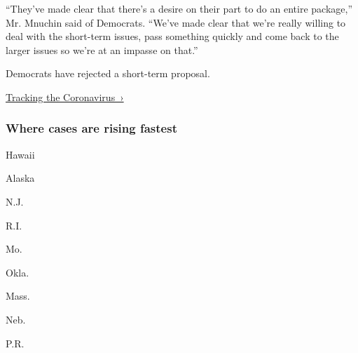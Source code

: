 ``They've made clear that there's a desire on their part to do an entire
package,'' Mr. Mnuchin said of Democrats. ``We've made clear that we're
really willing to deal with the short-term issues, pass something
quickly and come back to the larger issues so we're at an impasse on
that.''

Democrats have rejected a short-term proposal.

\href{https://www.nytimes.com/interactive/2020/us/coronavirus-us-cases.html}{Tracking
the Coronavirus~›}

\href{https://www.nytimes.com/interactive/2020/us/coronavirus-us-cases.html}{}

\hypertarget{where-cases-are-rising-fastest}{%
\subsubsection{\texorpdfstring{Where cases are \textbf{rising}
fastest}{Where cases are rising fastest}}\label{where-cases-are-rising-fastest}}

\href{https://www.nytimes.com/interactive/2020/us/hawaii-coronavirus-cases.html}{}

Hawaii

\href{https://www.nytimes.com/interactive/2020/us/alaska-coronavirus-cases.html}{}

Alaska

\href{https://www.nytimes.com/interactive/2020/us/new-jersey-coronavirus-cases.html}{}

N.J.

\href{https://www.nytimes.com/interactive/2020/us/rhode-island-coronavirus-cases.html}{}

R.I.

\href{https://www.nytimes.com/interactive/2020/us/missouri-coronavirus-cases.html}{}

Mo.

\href{https://www.nytimes.com/interactive/2020/us/oklahoma-coronavirus-cases.html}{}

Okla.

\href{https://www.nytimes.com/interactive/2020/us/massachusetts-coronavirus-cases.html}{}

Mass.

\href{https://www.nytimes.com/interactive/2020/us/nebraska-coronavirus-cases.html}{}

Neb.

\href{https://www.nytimes.com/interactive/2020/us/puerto-rico-coronavirus-cases.html}{}

P.R.

